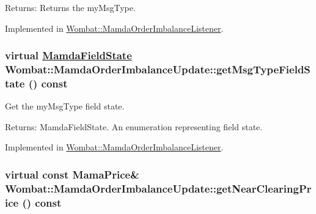 \begin{Desc}
\item[Returns:]Returns the my\-Msg\-Type. \end{Desc}


Implemented in \hyperlink{classWombat_1_1MamdaOrderImbalanceListener_041c934f699fe71fb16d9154bc444bf0}{Wombat::Mamda\-Order\-Imbalance\-Listener}.\hypertarget{classWombat_1_1MamdaOrderImbalanceUpdate_389c47fd797b8c7648ef8abf9c6fb518}{
\subsubsection[getMsgTypeFieldState]{\setlength{\rightskip}{0pt plus 5cm}virtual \hyperlink{namespaceWombat_93aac974f2ab713554fd12a1fa3b7d2a}{Mamda\-Field\-State} Wombat::Mamda\-Order\-Imbalance\-Update::get\-Msg\-Type\-Field\-State () const}}
\label{classWombat_1_1MamdaOrderImbalanceUpdate_389c47fd797b8c7648ef8abf9c6fb518}


Get the my\-Msg\-Type field state. 

\begin{Desc}
\item[Returns:]Mamda\-Field\-State. An enumeration representing field state. \end{Desc}


Implemented in \hyperlink{classWombat_1_1MamdaOrderImbalanceListener_69ecc694f33d3fb39064a3fa1b0d8ef3}{Wombat::Mamda\-Order\-Imbalance\-Listener}.\hypertarget{classWombat_1_1MamdaOrderImbalanceUpdate_f898c7cf3351360df08d12992374df0c}{
\subsubsection[getNearClearingPrice]{\setlength{\rightskip}{0pt plus 5cm}virtual const Mama\-Price\& Wombat::Mamda\-Order\-Imbalance\-Update::get\-Near\-Clearing\-Price () const}}
\label{classWombat_1_1MamdaOrderImbalanceUpdate_f898c7cf3351360df08d12992374df0c}


